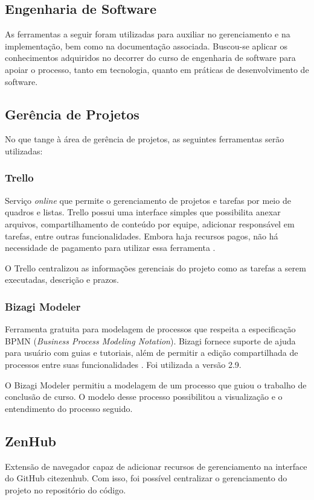 \begin{apendicesenv}
\section{Engenharia de Software}
As ferramentas a seguir foram utilizadas para auxiliar no gerenciamento e na implementação, bem como na documentação associada. Buscou-se aplicar os conhecimentos adquiridos no decorrer do curso de engenharia de software para apoiar o processo, tanto em tecnologia, quanto em práticas de desenvolvimento de software.

\subsection{Gerência de Projetos}
No que tange à área de gerência de projetos, as seguintes ferramentas serão utilizadas:

\subsubsection{Trello} 
Serviço \textit{online} que permite o gerenciamento de projetos e tarefas por meio de quadros e listas. Trello possui uma interface simples que possibilita anexar arquivos, compartilhamento de conteúdo por equipe, adicionar responsável em tarefas,  entre outras funcionalidades. Embora haja recursos pagos, não há necessidade de pagamento para utilizar essa ferramenta \cite{trello2015}.
\par
\indent O Trello centralizou as informações gerenciais do projeto como as tarefas a serem executadas, descrição e prazos. 

\subsubsection{Bizagi Modeler}
Ferramenta gratuita para modelagem de processos que respeita a especificação BPMN (\textit{Business Process Modeling Notation}). Bizagi fornece suporte de ajuda para usuário com guias e tutoriais, além de permitir a edição compartilhada de processos entre suas funcionalidades \cite{bizagi2015}. Foi utilizada a versão 2.9.
\par
\indent O Bizagi Modeler permitiu a modelagem de um processo que guiou o trabalho de conclusão de curso. O modelo desse processo possibilitou a visualização e o entendimento do processo seguido.

\subsection{ZenHub}
Extensão de navegador capaz de adicionar recursos de gerenciamento na interface do GitHub cite{zenhub}. Com isso, foi possível centralizar o gerenciamento do projeto no repositório do código.




\end{apendicesenv}

